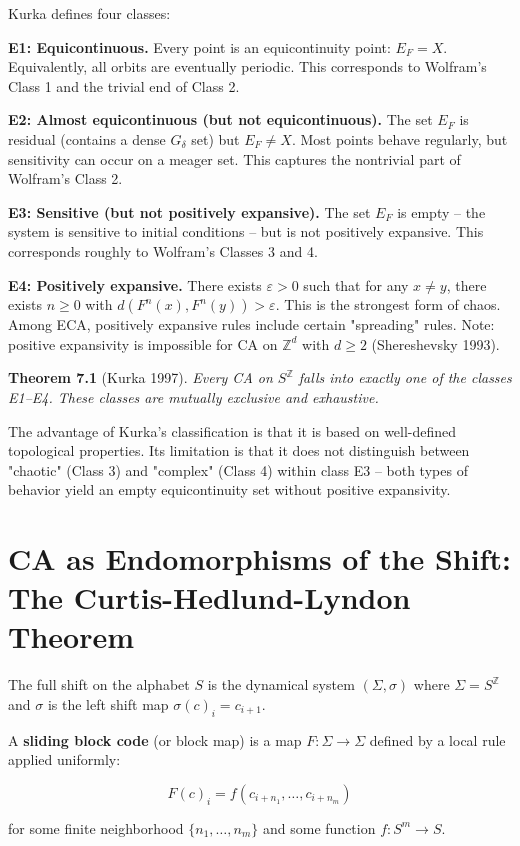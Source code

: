 Kurka defines four classes:

\textbf{E1: Equicontinuous.} Every point is an equicontinuity point: $E_F = X$. Equivalently, all orbits are eventually periodic. This corresponds to Wolfram's Class 1 and the trivial end of Class 2.

\textbf{E2: Almost equicontinuous (but not equicontinuous).} The set $E_F$ is residual (contains a dense $G_\delta$ set) but $E_F \neq X$. Most points behave regularly, but sensitivity can occur on a meager set. This captures the nontrivial part of Wolfram's Class 2.

\textbf{E3: Sensitive (but not positively expansive).} The set $E_F$ is empty -- the system is sensitive to initial conditions -- but is not positively expansive. This corresponds roughly to Wolfram's Classes 3 and 4.

\textbf{E4: Positively expansive.} There exists $\varepsilon > 0$ such that for any $x \neq y$, there exists $n \geq 0$ with $d(F^n(x), F^n(y)) > \varepsilon$. This is the strongest form of chaos. Among ECA, positively expansive rules include certain "spreading" rules. Note: positive expansivity is impossible for CA on $\mathbb{Z}^d$ with $d \geq 2$ (Shereshevsky 1993).

\textbf{Theorem 7.1} (Kurka 1997). \textit{Every CA on $S^{\mathbb{Z}}$ falls into exactly one of the classes E1--E4. These classes are mutually exclusive and exhaustive.}

The advantage of Kurka's classification is that it is based on well-defined topological properties. Its limitation is that it does not distinguish between "chaotic" (Class 3) and "complex" (Class 4) within class E3 -- both types of behavior yield an empty equicontinuity set without positive expansivity.


\section{CA as Endomorphisms of the Shift: The Curtis-Hedlund-Lyndon Theorem}

The full shift on the alphabet $S$ is the dynamical system $(\Sigma, \sigma)$ where $\Sigma = S^{\mathbb{Z}}$ and $\sigma$ is the left shift map $\sigma(c)_i = c_{i+1}$.

A \textbf{sliding block code} (or block map) is a map $F: \Sigma \to \Sigma$ defined by a local rule applied uniformly:

\[F(c)_i = f(c_{i+n_1}, \ldots, c_{i+n_m})\]

for some finite neighborhood $\{ n_1, \ldots, n_m\} $ and some function $f: S^m \to S$.

